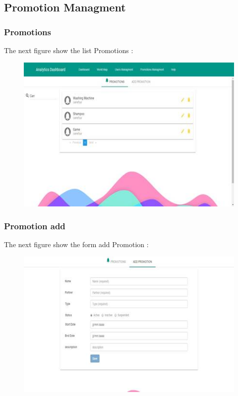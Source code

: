 \subsection{Promotion Managment}
\label{sec:sec01}
\subsubsection{Promotions}
\label{sec:sec01}
The next figure show the list Promotions :
\begin{figure}[h!]
	\centering
	\includegraphics[height=0.3\textheight]{fig01/PromotionManagement}
	\label{fig:FilialesEtClients}
\end{figure}
\subsubsection{Promotion add}
\label{sec:sec01}
The next figure show the form add Promotion :
\begin{figure}[h!]
	\centering
	\includegraphics[height=0.3\textheight]{fig01/PromotionAdd}
	\label{fig:FilialesEtClients}
\end{figure}

